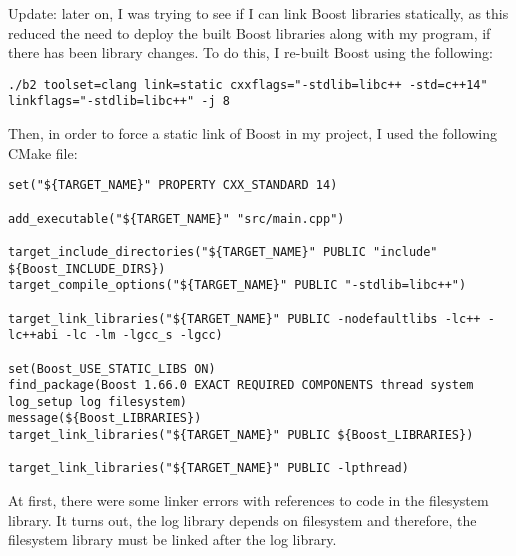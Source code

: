 Update: later on, I was trying to see if I can link Boost libraries statically, as this reduced the need to deploy the built Boost libraries along with my program, if there has been library changes. To do this, I re-built Boost using the following:
\begin{lstlisting}
./b2 toolset=clang link=static cxxflags="-stdlib=libc++ -std=c++14" linkflags="-stdlib=libc++" -j 8
\end{lstlisting}

Then, in order to force a static link of Boost in my project, I used the following CMake file:
\begin{lstlisting}
set("${TARGET_NAME}" PROPERTY CXX_STANDARD 14)

add_executable("${TARGET_NAME}" "src/main.cpp")

target_include_directories("${TARGET_NAME}" PUBLIC "include" ${Boost_INCLUDE_DIRS})
target_compile_options("${TARGET_NAME}" PUBLIC "-stdlib=libc++")

target_link_libraries("${TARGET_NAME}" PUBLIC -nodefaultlibs -lc++ -lc++abi -lc -lm -lgcc_s -lgcc)

set(Boost_USE_STATIC_LIBS ON)
find_package(Boost 1.66.0 EXACT REQUIRED COMPONENTS thread system log_setup log filesystem)
message(${Boost_LIBRARIES})
target_link_libraries("${TARGET_NAME}" PUBLIC ${Boost_LIBRARIES})

target_link_libraries("${TARGET_NAME}" PUBLIC -lpthread)
\end{lstlisting}

At first, there were some linker errors with references to code in the filesystem library. It turns out, the log library depends on filesystem and therefore, the filesystem library must be linked after the log library.

